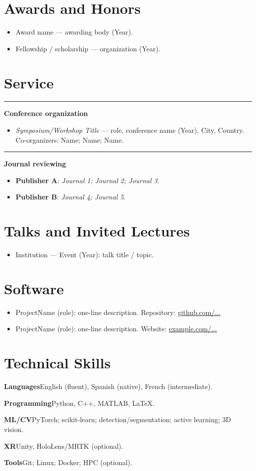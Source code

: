 \documentclass[11pt]{article}
\newcommand{\cvsection}[1]{\needspace{8\baselineskip}\section*{#1}}
\newcommand{\cvsubhead}[1]{%
  \vspace{6pt}\noindent
  {\color{cvrule}\rule{1.2pt}{10pt}}\hspace{0.7em}%
  {\color{cvgray}\normalsize\bfseries #1}\par\vspace{2pt}%
}
\newenvironment{cvsublist}{%
  \begin{itemize}[leftmargin=18pt, itemsep=2pt, topsep=2pt, parsep=0pt, partopsep=0pt]
}{%
  \end{itemize}\vspace{2pt}
}
\newcommand{\cvitem}[2]{%
  \noindent\textbf{#1}\hspace{0.6em}#2\par\vspace{3pt}%
}
\newif\ifShowReferences
\begin{document}
\cvsection{Awards and Honors}
\begin{itemize}
  \item Award name — awarding body (Year).
  \item Fellowship / scholarship — organization (Year).
\end{itemize}

\cvsection{Service}
\cvsubhead{Conference organization}
\begin{cvsublist}
  \item \textit{Symposium/Workshop Title} — role, conference name (Year), City, Country. Co-organizers: Name; Name; Name.
\end{cvsublist}

\cvsubhead{Journal reviewing}
\begin{cvsublist}
  \item \textbf{Publisher A}: \textit{Journal 1; Journal 2; Journal 3}.
  \item \textbf{Publisher B}: \textit{Journal 4; Journal 5}.
\end{cvsublist}

\cvsection{Talks and Invited Lectures}
\begin{itemize}
  \item Institution — Event (Year): talk title / topic.
\end{itemize}

\cvsection{Software}
\begin{itemize}
  \item ProjectName (role): one-line description. Repository: \href{https://github.com}{github.com/...}
  \item ProjectName (role): one-line description. Website: \href{https://example.com}{example.com/...}
\end{itemize}

\cvsection{Technical Skills}
\cvitem{Languages}{English (fluent), Spanish (native), French (intermediate).}
\cvitem{Programming}{Python, C++, MATLAB, \LaTeX.}
\cvitem{ML/CV}{PyTorch; scikit-learn; detection/segmentation; active learning; 3D vision.}
\cvitem{XR}{Unity, HoloLens/MRTK (optional).}
\cvitem{Tools}{Git; Linux; Docker; HPC (optional).}

\ifShowReferences
\cvsection{References}
\begin{itemize}
  \item Prof.\ A.\ Advisor (Example University) — \href{mailto:advisor@university.edu}{advisor@university.edu} — +00 0000 0000
  \item Prof.\ B.\ Collaborator (Example Institute) — \href{mailto:collab@institute.org}{collab@institute.org} — +00 0000 0000
\end{itemize}
\fi
\end{document}
